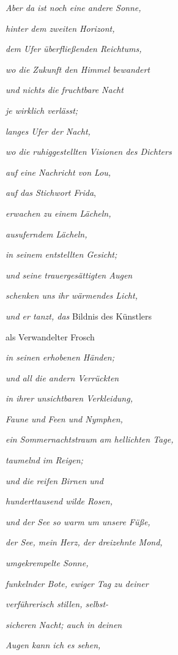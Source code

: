 \bigskip

\emph{
Aber da ist noch eine andere Sonne,}

\emph{
hinter dem zweiten Horizont,}

\emph{
dem Ufer überfließenden Reichtums, }

\emph{
wo die Zukunft den Himmel bewandert}

\emph{
und nichts die fruchtbare Nacht }

\emph{
je wirklich verlässt;}

\emph{
langes Ufer der Nacht, }

\emph{
wo die ruhiggestellten Visionen des Dichters }

\emph{
auf eine Nachricht von Lou, }

\emph{auf das Stichwort {\upshape Frida}},

\emph{
erwachen zu einem Lächeln,}

\emph{
ausuferndem Lächeln,}

\emph{
in seinem entstellten Gesicht;}

\emph{
und seine trauergesättigten Augen}

\emph{
schenken uns ihr wärmendes Licht, }

\emph{und er tanzt, das }Bildnis des Künstlers

als Verwandelter Frosch 

\emph{
in seinen erhobenen Händen;}

\emph{
und all die andern Verrückten}

\emph{
in ihrer unsichtbaren Verkleidung,}

\emph{
Faune und Feen und Nymphen,}

\emph{
ein Sommernachtstraum am hellichten Tage,}

\emph{
taumelnd im Reigen;}

\emph{
und die reifen Birnen und}

\emph{
hunderttausend wilde Rosen,}

\emph{
und der See so warm um unsere Füße,}

\emph{
der See, mein Herz, der dreizehnte Mond, }

\emph{
umgekrempelte Sonne,}

\emph{
funkelnder Bote, ewiger Tag zu deiner}

\emph{
verführerisch stillen, selbst-}

\emph{
sicheren Nacht; auch in deinen}

\emph{
Augen kann ich es sehen,}

